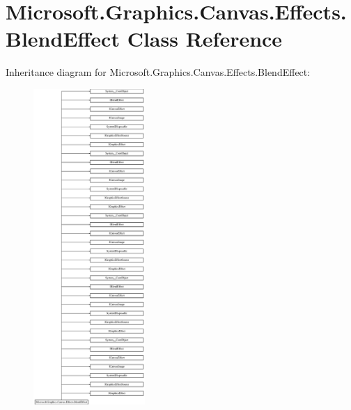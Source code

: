 \hypertarget{class_microsoft_1_1_graphics_1_1_canvas_1_1_effects_1_1_blend_effect}{}\section{Microsoft.\+Graphics.\+Canvas.\+Effects.\+Blend\+Effect Class Reference}
\label{class_microsoft_1_1_graphics_1_1_canvas_1_1_effects_1_1_blend_effect}
Inheritance diagram for Microsoft.\+Graphics.\+Canvas.\+Effects.\+Blend\+Effect\+:\begin{figure}[H]
\begin{center}
\leavevmode
\includegraphics[height=12.000000cm]{class_microsoft_1_1_graphics_1_1_canvas_1_1_effects_1_1_blend_effect}
\end{center}
\end{figure}
